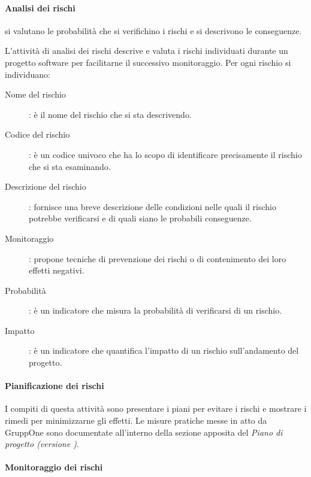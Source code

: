 \documentclass[../../norme-di-progetto.tex]{subfiles}
\begin{document}
\paragraph{Analisi dei rischi}%
\label{par:analisi__dei_rischi}

si valutano le probabilità che si verifichino i rischi e si descrivono le conseguenze.

L'attività di analisi dei rischi descrive e valuta i rischi individuati durante un progetto software per facilitarne il successivo monitoraggio. Per ogni rischio si individuano:
\begin{description}
  \item[Nome del rischio]: è il nome del rischio che si sta descrivendo.
  \item[Codice del rischio]: è un codice univoco che ha lo scopo di identificare precisamente il rischio che si sta esaminando.
  \item[Descrizione del rischio]: fornisce una breve descrizione delle condizioni nelle quali il rischio potrebbe verificarsi e di quali siano le probabili conseguenze.
  \item[Monitoraggio]: propone tecniche di prevenzione dei rischi o di contenimento dei loro effetti negativi.
  \item[Probabilità]: è un indicatore che misura la probabilità di verificarsi di un rischio.
  \item[Impatto]: è un indicatore che quantifica l'impatto di un rischio sull'andamento del progetto.
\end{description}

\paragraph{Pianificazione dei rischi}%
\label{par:pianificazione_dei_rischi}

I compiti di questa attività sono presentare i piani per evitare i rischi e mostrare i rimedi per minimizzarne gli effetti.
Le misure pratiche messe in atto da GruppOne sono documentate all'interno della sezione apposita del \textit{Piano di progetto (versione \versione)}.


\paragraph{Monitoraggio dei rischi}%
\label{par:monitoraggio_dei_rischi}
\end{document}
